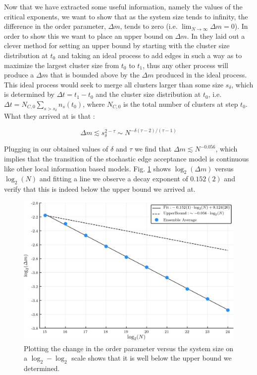 Now that we have extracted some useful information, namely the values of the critical exponents, we want to show that as the system size tends to infinity, the difference in the order parameter, $\Delta m$, tends to zero (i.e. $\lim_{N \rightarrow \infty} \Delta m = 0$).
In order to show this we want to place an upper bound on $\Delta m$. In \cite{Lee_1} they laid out a clever method for setting an upper bound by starting with the cluster size distribution at $t_0$ and taking an ideal process to add edges in such a way as to maximize the largest cluster size from $t_0$ to $t_1$, thus any other process will produce a $\Delta m$ that is bounded above by the $\Delta m$ produced in the ideal process.
This ideal process would seek to merge all clusters larger than some size $s_\delta$, which is determined by $\Delta t = t_1 - t_0$ and the cluster size distribution at $t_0$, i.e. $\Delta t = N_{C, 0} \sum_{s > s_\delta} n_s(t_0)$, where $N_{C, 0}$ is the total number of clusters at step $t_0$.
What they arrived at is that \cite{Lee_1}:

\begin{equation}
	\Delta m \lesssim s_\delta^{2 - \tau} \sim N^{-\delta (\tau - 2) / (\tau - 1)}
\end{equation}

Plugging in our obtained values of $\delta$ and $\tau$ we find that $\Delta m \lesssim N^{-0.056}$, which implies that the transition of the stochastic edge acceptance model is continuous like other local information based models.
Fig. \ref{fig:delta_m_scaling} shows $\log_2(\Delta m)$ versus $\log_2(N)$ and fitting a line we observe a decay exponent of $0.152(2)$ and verify that this is indeed below the upper bound we arrived at.

\begin{figure}[H]
	\centering
	\includegraphics[width=350pt, clip]{images/delta_m_scaling.png}
	\caption{Plotting the change in the order parameter versus the system size on a $\log_2-\log_2$ scale shows that it is well below the upper bound we determined.}
	\label{fig:delta_m_scaling}
\end{figure}



